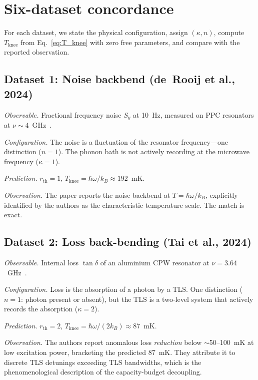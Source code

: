 \documentclass[11pt]{article}
\begin{document}
\section{Six-dataset concordance}

For each dataset, we state the physical configuration, assign $(\kappa, n)$, compute $T_{\mathrm{knee}}$ from Eq.~\eqref{eq:T_knee} with zero free parameters, and compare with the reported observation.

\subsection{Dataset 1: Noise backbend (de~Rooij et al., 2024)}

\textit{Observable.}  Fractional frequency noise $S_y$ at 10~Hz, measured on PPC resonators at $\nu \sim 4$~GHz~\cite{deRooij2024}.

\textit{Configuration.}  The noise is a fluctuation of the resonator frequency---one distinction ($n = 1$).  The phonon bath is not actively recording at the microwave frequency ($\kappa = 1$).

\textit{Prediction.}  $r_{\mathrm{th}} = 1$, $T_{\mathrm{knee}} = \hbar\omega / k_B \approx 192$~mK.

\textit{Observation.}  The paper reports the noise backbend at $T = \hbar\omega / k_B$, explicitly identified by the authors as the characteristic temperature scale.  The match is exact.

\subsection{Dataset 2: Loss back-bending (Tai et al., 2024)}

\textit{Observable.}  Internal loss $\tan\delta$ of an aluminium CPW resonator at $\nu = 3.64$~GHz~\cite{Tai2024}.

\textit{Configuration.}  Loss is the absorption of a photon by a TLS.  One distinction ($n = 1$: photon present or absent), but the TLS is a two-level system that actively records the absorption ($\kappa = 2$).

\textit{Prediction.}  $r_{\mathrm{th}} = 2$, $T_{\mathrm{knee}} = \hbar\omega / (2k_B) \approx 87$~mK.

\textit{Observation.}  The authors report anomalous loss \emph{reduction} below $\sim$50--100~mK at low excitation power, bracketing the predicted 87~mK.  They attribute it to discrete TLS detunings exceeding TLS bandwidths, which is the phenomenological description of the capacity-budget decoupling.
\end{document}

